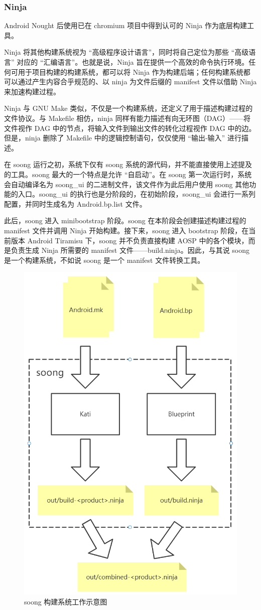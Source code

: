 \subsubsection{Ninja}

Android Nought 后使用已在 chromium 项目中得到认可的 Ninja 作为底层构建工具。

Ninja 将其他构建系统视为 “高级程序设计语言”，同时将自己定位为那些 “高级语言” 对应的 “汇编语言”\cite{NINJABUILD}。也就是说，Ninja 旨在提供一个高效的命令执行环境。任何可用于项目构建的构建系统，都可以将 Ninja 作为构建后端；任何构建系统都可以通过产生内容合乎规范的、以 ninja 为文件后缀的 manifest 文件以借助 Ninja 来加速构建过程。

Ninja 与 GNU Make 类似，不仅是一个构建系统，还定义了用于描述构建过程的文件协议。与 Makefile 相仿，ninja 同样有能力描述有向无环图（DAG）——将文件视作 DAG 中的节点，将输入文件到输出文件的转化过程视作 DAG 中的边。但是，ninja 删除了 Makefile 中的逻辑控制语句，仅仅使用 “输出-输入” 进行描述。

在 soong 运行之初，系统下仅有 soong 系统的源代码，并不能直接使用上述提及的工具。soong 最大的一个特点是允许 “自启动”。在 soong 第一次运行时，系统会自动编译名为 soong\_ui 的二进制文件，该文件作为此后用户使用 soong 其他功能的入口。soong\_ui 的执行也是分阶段的，在初始阶段，soong\_ui 会进行一系列配置，并同时生成名为 Android.bp.list 文件。

此后，soong 进入 minibootstrap 阶段。soong 在本阶段会创建描述构建过程的 manifest 文件并调用 Ninja 开始构建。接下来，soong 进入 bootstrap 阶段，在当前版本 Android Tiramisu 下，soong 并不负责直接构建 AOSP 中的各个模块，而是负责生成 Ninja 所需要的 manifest 文件——build.ninja。因此，与其说 soong 是一个构建系统，不如说 soong 是一个 manifest 文件转换工具。

\begin{figure}[h]
    \centering
    \includegraphics[width=.4\textwidth]{figures/soong-arch.png}
    \caption{soong 构建系统工作示意图}
    \label{fig:soong-architecture}
\end{figure}

